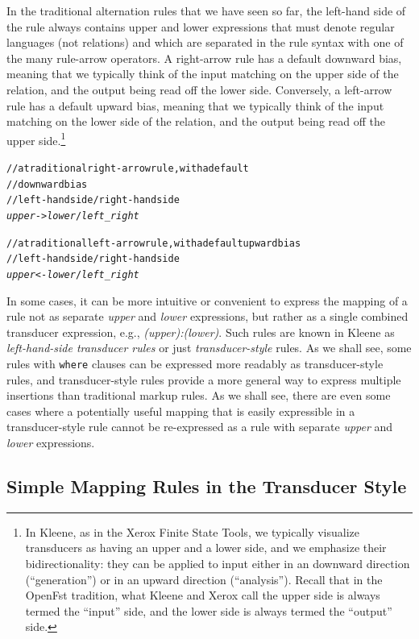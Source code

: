 In the traditional alternation rules that we have seen so far, the
left-hand side of the rule always contains upper and lower expressions
that must denote regular languages (not relations) and which are
separated in the rule syntax with one of the many rule-arrow operators.
A right-arrow rule has a default downward bias, meaning that we typically
think of the input matching on the upper side of the relation, and the
output being read off the lower side.  Conversely, a left-arrow rule has
a default upward bias, meaning that we typically think of the input
matching on the lower side of the relation, and the output being read off
the upper side.\footnote{In Kleene, as in the Xerox Finite State Tools,
	we typically visualize transducers as having an upper and a lower
	side, and we emphasize their bidirectionality: they can be applied to
	input either in an downward direction (``generation'') or in an
	upward direction (``analysis'').  Recall that in the OpenFst
	tradition, what Kleene and Xerox call the upper side is always termed
the ``input'' side, and the lower side is always termed the ``output''
side.}

\begin{alltt}
// a traditional right-arrow rule, with a default 
//    downward bias
// left-hand side / right-hand side
\emph{upper} -> \emph{lower} / \emph{left} _ \emph{right}

// a traditional left-arrow rule, with a default upward bias
// left-hand side / right-hand side
\emph{upper} <- \emph{lower} / \emph{left} _ \emph{right}
\end{alltt}

In some cases, it can be more intuitive or convenient to express the
mapping of a rule not as separate \emph{upper} and \emph{lower}
expressions, but rather as a single combined transducer expression, e.g.,
\emph{(upper):(lower)}.  Such rules are known in Kleene as
\emph{left-hand-side transducer rules} or just \emph{transducer-style}
rules.  As we shall see, some rules with \texttt{where} clauses can be
expressed more readably as transducer-style rules, and transducer-style
rules provide a more general way to express multiple insertions than
traditional markup rules.  As we shall see, there are even some cases
where a potentially useful mapping that is easily expressible in a
transducer-style rule cannot be re-expressed as a rule with separate
\emph{upper} and \emph{lower} expressions.

\subsection{Simple Mapping Rules in the Transducer Style}

